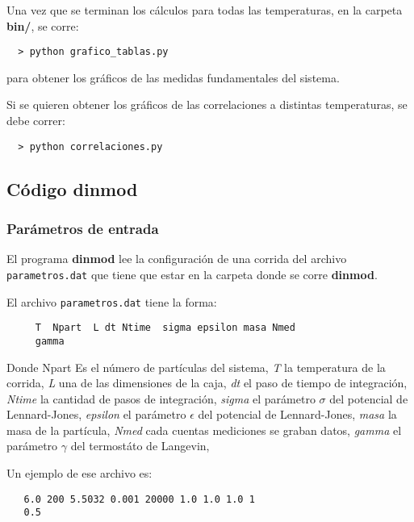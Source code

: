 Una vez que se terminan los cálculos para todas las temperaturas,  en 
la carpeta \textbf{bin/}, se corre:

\begin{verbatim}
  > python grafico_tablas.py 
\end{verbatim}

para obtener los gráficos de las medidas fundamentales del sistema.

Si se quieren obtener los gráficos de las correlaciones a distintas temperaturas, 
se debe correr:

\begin{verbatim}
  > python correlaciones.py 
\end{verbatim}

\subsection{C\'odigo dinmod}

\subsubsection{Par\'ametros de entrada}

El programa \textbf{\textbf{dinmod}} lee la configuraci\'on de una corrida del 
archivo \texttt{parametros.dat} que tiene que estar en la carpeta donde se
corre \textbf{\textbf{dinmod}}.

El archivo \texttt{parametros.dat} tiene la forma: 

\begin{verbatim}
     T  Npart  L dt Ntime  sigma epsilon masa Nmed
     gamma
\end{verbatim}

Donde Npart
Es el número de partículas del sistema, \textit{T} la temperatura de la corrida,
\textit{L} una de las dimensiones de la caja, \textit{dt} el paso de tiempo de integración,
\textit{Ntime} la cantidad de pasos de integración,
\textit{sigma} el parámetro $\sigma$ del potencial de Lennard-Jones,
\textit{epsilon} el parámetro $\epsilon$ del potencial de Lennard-Jones,
\textit{masa} la masa de la partícula,
\textit{Nmed} cada cuentas mediciones se graban datos,
\textit{gamma} el parámetro $\gamma$ del termostáto de Langevin,

Un ejemplo de ese archivo es:

\begin{verbatim}
   6.0 200 5.5032 0.001 20000 1.0 1.0 1.0 1
   0.5
\end{verbatim}

